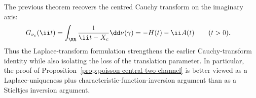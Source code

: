 \begin{remark}
The previous theorem recovers the centred Cauchy transform on the
imaginary axis:
\[
G_{\nu_c}(\ii t)
=\int_{\RR}\frac{1}{\ii t-X_c}\dd\nu(\gamma)
=-H(t)-\ii A(t)
\qquad(t>0).
\]
Thus the Laplace-transform formulation strengthens the earlier
Cauchy-transform identity while also isolating the loss of the translation
parameter.  In particular, the proof of
Proposition~\ref{prop:poisson-central-two-channel} is better viewed as a
Laplace-uniqueness plus characteristic-function-inversion argument than
as a Stieltjes inversion argument.
\end{remark}
